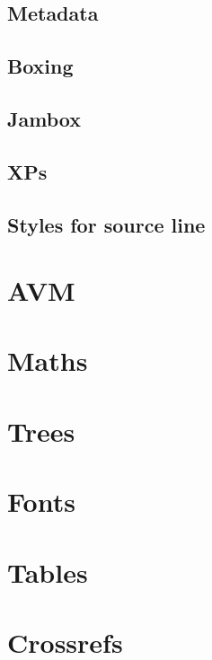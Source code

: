 \documentclass[output=book
  ,colorlinks
  ,showindex
  ]{langscibook}
\begin{document}
\subsection{Metadata}

\subsection{Boxing}

\subsection{Jambox}

\subsection{XPs}




\subsection{Styles for source line}




\section{AVM}


\section{Maths}


\section{Trees}


\section{Fonts}



\section{Tables}\label{sec:tables}



\section{Crossrefs}

\end{document}
